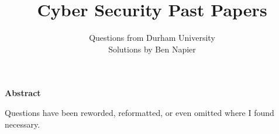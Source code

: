 \documentclass[a4paper, answers]{exam}
\title{Cyber Security Past Papers}
\author{
    Questions from Durham University \\ 
    Solutions by Ben Napier
}
\begin{document}
    \begin{titlepage}
        \maketitle
    \end{titlepage}

    \tableofcontents
    \clearpage

    \thispagestyle{empty}
    \vspace*{21.5em}
    \begin{center}
        \parbox{0.77\textwidth}{
            \noindent
            \begin{center}
                \normalsize\textbf{Abstract}
            \end{center}
            \vspace{-3pt}
            Questions have been reworded, reformatted, 
            or even omitted where I found necessary.
        }
    \end{center}
    \vspace*{\fill}

    \clearpage
    \begin{questions}
        
        
    \end{questions}
\end{document}
